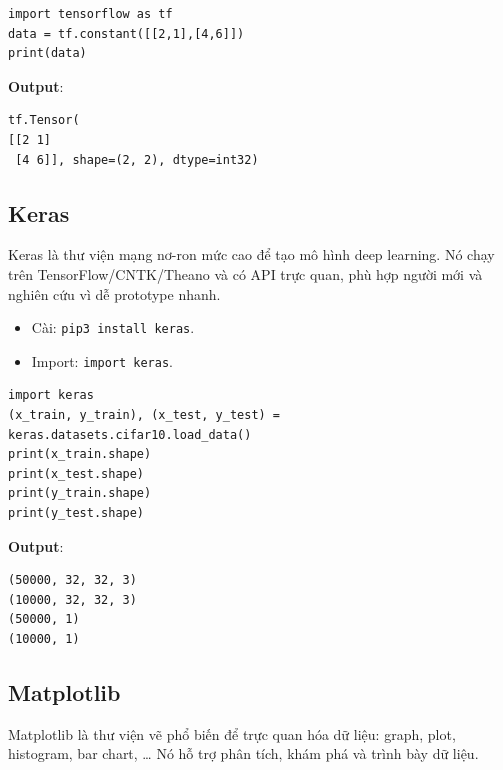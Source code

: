 \begin{vidu}[title={Ví dụ: tạo tensor}]
\begin{lstlisting}
import tensorflow as tf
data = tf.constant([[2,1],[4,6]])
print(data)
\end{lstlisting}

\textbf{Output}:
\begin{lstlisting}
tf.Tensor(
[[2 1]
 [4 6]], shape=(2, 2), dtype=int32)
\end{lstlisting}
\end{vidu}

\subsection{Keras}

\begin{dinhnghia}[title={Keras}]
Keras là thư viện mạng nơ-ron mức cao để tạo mô hình deep learning.
Nó chạy trên TensorFlow/CNTK/Theano và có API trực quan, phù hợp người mới và nghiên cứu vì dễ prototype nhanh.
\end{dinhnghia}

\begin{phuongphap}[title={Cài đặt/nhập}]
\begin{itemize}
  \item Cài: \texttt{pip3 install keras}.
  \item Import: \texttt{import keras}.
\end{itemize}
\end{phuongphap}

\begin{vidu}[title={Ví dụ: dùng CIFAR-10 dataset}]
\begin{lstlisting}
import keras
(x_train, y_train), (x_test, y_test) = keras.datasets.cifar10.load_data()
print(x_train.shape)
print(x_test.shape)
print(y_train.shape)
print(y_test.shape)
\end{lstlisting}

\textbf{Output}:
\begin{lstlisting}
(50000, 32, 32, 3)
(10000, 32, 32, 3)
(50000, 1)
(10000, 1)
\end{lstlisting}
\end{vidu}

\subsection{Matplotlib}

\begin{dinhnghia}[title={Matplotlib}]
Matplotlib là thư viện vẽ phổ biến để trực quan hóa dữ liệu: graph, plot, histogram, bar chart, \ldots
Nó hỗ trợ phân tích, khám phá và trình bày dữ liệu.
\end{dinhnghia}

